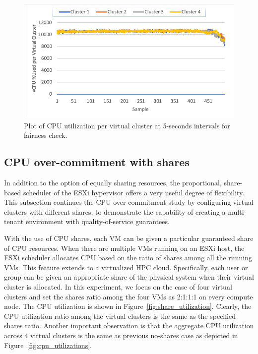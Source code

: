 \begin{figure}[!t]
   \begin{center}
       \includegraphics[width=\columnwidth]{Figures/per_cluster_utilization}
   \end{center}
   \caption{Plot of CPU utilization per virtual cluster at 5-seconds intervals for fairness check.}
   \label{fig:per_cluster_utilization}
   \vspace{-0.2in}
 \end{figure}

\subsection{CPU over-commitment with shares}
In addition to the option of equally sharing resources, the proportional, share-based scheduler of the ESXi hypervisor offers a very useful degree of flexibility. This subsection continues the CPU over-commitment study by configuring virtual clusters with different shares, to demonstrate the capability of creating a multi-tenant environment with quality-of-service guarantees. 

With the use of CPU shares, each VM can be given a particular guaranteed share of CPU resources. When there are multiple VMs running on an ESXi host, the ESXi scheduler allocates CPU based on the ratio of shares among all the running VMs. This feature extends to a virtualized HPC cloud. Specifically, each user or group can be given an appropriate share of the physical system when their virtual cluster is allocated. In this experiment, we focus on the case of four virtual clusters and set the shares ratio among the four VMs as 2:1:1:1 on every compute node. The CPU utilization is shown in Figure~\ref{fig:share_utilization}. Clearly, the CPU utilization ratio among the virtual clusters is the same as the specified shares ratio. Another important observation is that the aggregate CPU utilization across 4 virtual clusters is the same as previous no-shares case as depicted in Figure~\ref{fig:cpu_utilizations}.


